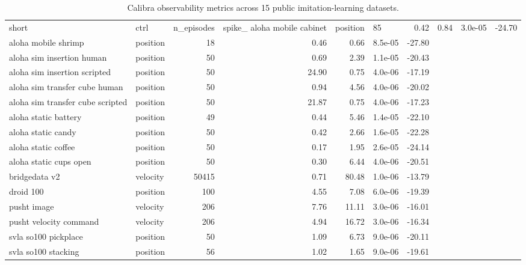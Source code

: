 \begin{table}
\caption{Calibra observability metrics across 15 public imitation-learning datasets.}
\label{tab:cross_dataset}
\begin{tabular}{llrrrlr}
\toprule
short & ctrl & n_episodes & spike_%
\midrule
aloha mobile cabinet & position & 85 & 0.42 & 0.84 & 3.0e-05 & -24.70 \\
aloha mobile shrimp & position & 18 & 0.46 & 0.66 & 8.5e-05 & -27.80 \\
aloha sim insertion human & position & 50 & 0.69 & 2.39 & 1.1e-05 & -20.43 \\
aloha sim insertion scripted & position & 50 & 24.90 & 0.75 & 4.0e-06 & -17.19 \\
aloha sim transfer cube human & position & 50 & 0.94 & 4.56 & 4.0e-06 & -20.02 \\
aloha sim transfer cube scripted & position & 50 & 21.87 & 0.75 & 4.0e-06 & -17.23 \\
aloha static battery & position & 49 & 0.44 & 5.46 & 1.4e-05 & -22.10 \\
aloha static candy & position & 50 & 0.42 & 2.66 & 1.6e-05 & -22.28 \\
aloha static coffee & position & 50 & 0.17 & 1.95 & 2.6e-05 & -24.14 \\
aloha static cups open & position & 50 & 0.30 & 6.44 & 4.0e-06 & -20.51 \\
bridgedata v2 & velocity & 50415 & 0.71 & 80.48 & 1.0e-06 & -13.79 \\
droid 100 & position & 100 & 4.55 & 7.08 & 6.0e-06 & -19.39 \\
pusht image & velocity & 206 & 7.76 & 11.11 & 3.0e-06 & -16.01 \\
pusht velocity command & velocity & 206 & 4.94 & 16.72 & 3.0e-06 & -16.34 \\
svla so100 pickplace & position & 50 & 1.09 & 6.73 & 9.0e-06 & -20.11 \\
svla so100 stacking & position & 56 & 1.02 & 1.65 & 9.0e-06 & -19.61 \\
\bottomrule
\end{tabular}
\end{table}
